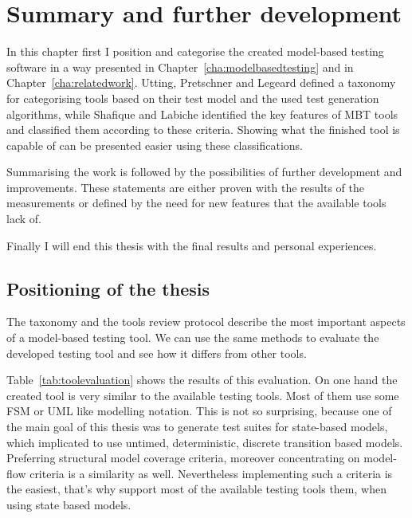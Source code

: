 \chapter{Summary and further development}
\label{cha:summary}

In this chapter first I position and categorise the created model-based testing software in a way presented in Chapter~\ref{cha:modelbasedtesting} and in Chapter~\ref{cha:relatedwork}. Utting, Pretschner and Legeard \cite{taxonomy} defined a taxonomy for categorising tools based on their test model and the used test generation algorithms, while Shafique and Labiche \cite{toolsreview} identified the key features of MBT tools and classified them according to these criteria. Showing what the finished tool is capable of can be presented easier using these classifications.

Summarising the work is followed by the possibilities of further development and improvements. These statements are either proven with the results of the measurements or defined by the need for new features that the available tools lack of.

Finally I will end this thesis with the final results and personal experiences.

\section{Positioning of the thesis}
\label{sec:positioning}

The taxonomy and the tools review protocol describe the most important aspects of a model-based testing tool. We can use the same methods to evaluate the developed testing tool and see how it differs from other tools.

Table~\ref{tab:toolevaluation} shows the results of this evaluation. On one hand the created tool is very similar to the available testing tools. Most of them use some FSM or UML like modelling notation. This is not so surprising, because one of the main goal of this thesis was to generate test suites for state-based models, which implicated to use untimed, deterministic, discrete transition based models. Preferring structural model coverage criteria, moreover concentrating on model-flow criteria is a similarity as well. Nevertheless implementing such a criteria is the easiest, that's why support most of the available testing tools them, when using state based models.

